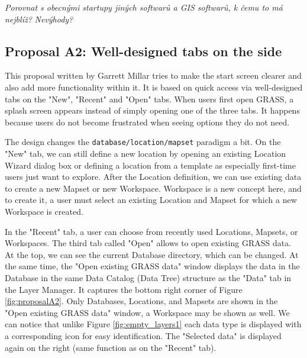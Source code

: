 \documentclass[a4paper,10pt,twoside]{article}
\begin{document}
\textit{\color{red} Porovnat s obecnými startupy jiných softwarů a GIS softwarů, k čemu to má nejblíž?}
\textit{\color{red} Nevýhody?}

\subsection{Proposal A2: Well-designed tabs on the side}

This proposal written by Garrett Millar tries to make the start screen clearer and also add more functionality within it. It is based on quick access via well-designed tabs on the "New", "Recent" and "Open" tabs. When users first open GRASS, a splash screen appears instead of simply opening one of the three tabs. It happens because users do not become frustrated when seeing options they do not need. 

The design changes the \texttt{database/location/mapset} paradigm a bit. On the "New" tab, we can still define a new location by opening an existing Location Wizard dialog box or defining a location from a template as especially first-time users just want to explore. After the Location definition, we can use existing data to create a new Mapset or new Workspace. Workspace is a new concept here, and to create it, a user must select an existing Location and Mapset for which a new Workspace is created.

In the "Recent" tab, a user can choose from recently used Locations, Mapsets, or Workspaces. The third tab called "Open" allows to open existing GRASS data. At the top, we can see the current Database directory, which can be changed. At the same time, the "Open existing GRASS data" window displays the data in the Database in the same Data Catalog (Data Tree) structure as the "Data" tab in the Layer Manager. It captures the bottom right corner of Figure \ref{fig:proposalA2}. Only Databases, Locations, and Mapsets are shown in the "Open existing GRASS data" window, a Workspace may be shown as well. We can notice that unlike Figure \ref{fig:empty_layers1} each data type is displayed with a corresponding icon for easy identification. The "Selected data" is displayed again on the right (same function as on the "Recent" tab).
\end{document}
